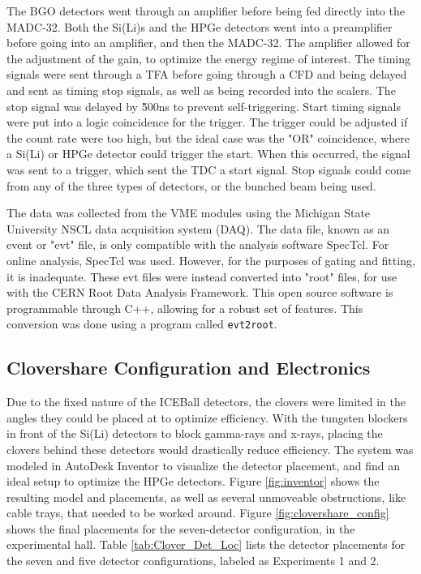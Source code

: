 

The BGO detectors went through an amplifier before being fed directly into the MADC-32. Both the Si(Li)s and the HPGe detectors went into a preamplifier before going into an amplifier, and then the MADC-32. The amplifier allowed for the adjustment of the gain, to optimize the energy regime of interest. The timing signals were sent through a TFA before going through a CFD and being delayed and sent as timing stop signals, as well as being recorded into the scalers. The stop signal was delayed by \~500ns to prevent self-triggering. Start timing signals were put into a logic coincidence for the trigger. The trigger could be adjusted if the count rate were too high, but the ideal case was the "OR" coincidence, where a Si(Li) or HPGe detector could trigger the start. When this occurred, the signal was sent to a trigger, which sent the TDC a start signal. Stop signals could come from any of the three types of detectors, or the bunched beam being used.

The data was collected from the VME modules using the Michigan State University NSCL data acquisition system (DAQ)\citep{nscl:_daq}. The data file, known as an event or "evt" file, is only compatible with the analysis software SpecTcl\citep{nscl:_daq}. For online analysis, SpecTcl was used. However, for the purposes of gating and fitting, it is inadequate. These evt files were instead converted into "root" files, for use with the CERN Root Data Analysis Framework\citep{brun97:_root}. This open source software is programmable through C++, allowing for a robust set of features. This conversion was done using a program called \texttt{evt2root}\citep{smith14:_evt2root}.

\subsection{Clovershare Configuration and Electronics}
\label{sec:clover_electronics}

Due to the fixed nature of the ICEBall detectors, the clovers were limited in the angles they could be placed at to optimize efficiency. With the tungsten blockers in front of the Si(Li) detectors to block gamma-rays and x-rays, placing the clovers behind these detectors would drastically reduce efficiency. The system was modeled in AutoDesk Inventor \citep{autodesk:_inventor} to visualize the detector placement, and find an ideal setup to optimize the HPGe detectors. Figure \ref{fig:inventor} shows the resulting model and placements, as well as several unmoveable obstructions, like cable trays, that needed to be worked around. Figure \ref{fig:clovershare_config} shows the final placements for the seven-detector configuration, in the experimental hall. Table \ref{tab:Clover_Det_Loc} lists the detector placements for the seven and five detector configurations, labeled as Experiments 1 and 2.

